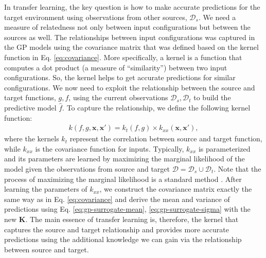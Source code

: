 In transfer learning, the key question is how to make accurate predictions for the target environment using observations from other sources, $\mathcal{D}_s$. We need a measure of relatedness not only between input configurations but between the sources as well. The relationships between input configurations was captured in the GP models using the covariance matrix that was defined based on the kernel function in Eq. \eqref{eq:covariance}. More specifically, a kernel is a function that computes a dot product (a measure of ``similarity'') between two input configurations. So, the kernel helps to get accurate predictions for similar configurations. We now need to exploit the relationship between the source and target functions, $g,f$, using the current observations $\mathcal{D}_s,\mathcal{D}_t$ to build the predictive model $\hat{f}$.
To capture the relationship, we define the following kernel function:
\begin{align}
\label{eq:mt-kernel}
k(f,g,\mathbf{x},\mathbf{x}')=k_t(f,g)\times k_{xx}(\mathbf{x},\mathbf{x}'),
\end{align}
where the kernels $k_t$ represent the correlation between source and target function, while $k_{xx}$ is the covariance function for inputs. Typically, $k_{xx}$ is parameterized and its parameters are learned by maximizing the marginal likelihood of the model given the observations from source and target $\mathcal{D}=\mathcal{D}_s\cup\mathcal{D}_t$. Note that the process of maximizing the marginal likelihood is a standard method \cite{gpml}.
After learning the parameters of $k_{xx}$, we construct the covariance matrix exactly the same way as in Eq. \ref{eq:covariance} and derive the mean and variance of predictions using Eq. \eqref{eq:gp-surrogate-mean}, \eqref{eq:gp-surrogate-sigma} with the new $\mathbf{K}$. The main essence of transfer learning is, therefore, the kernel that captures the source and target relationship and provides more accurate predictions using the additional knowledge we can gain via the relationship between source and target.




